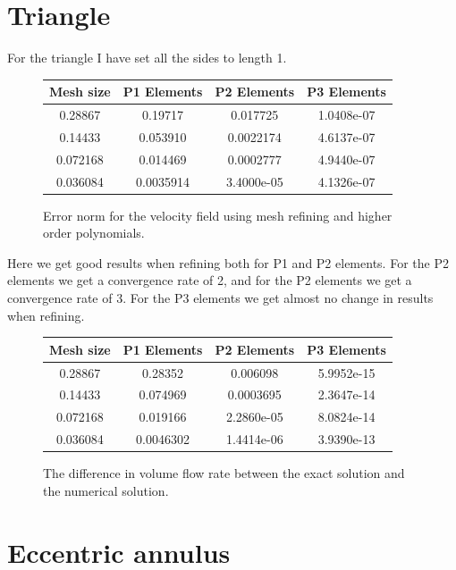 \documentclass[11pt]{report}
\begin{document}
\section*{Triangle}

For the triangle I have set all the sides to length 1.
\begin{figure}[htb]
\begin{center}
\begin{tabular}{|c|c|c|c|}
\hline
Mesh size & P1 Elements & P2 Elements & P3 Elements \\ \hline
0.28867 & 0.19717  & 0.017725 & 1.0408e-07         \\ \hline
0.14433 & 0.053910 & 0.0022174 & 4.6137e-07           \\ \hline
0.072168 & 0.014469 &  0.0002777 & 4.9440e-07           \\ \hline
0.036084 & 0.0035914 & 3.4000e-05 & 4.1326e-07           \\ \hline
\end{tabular}
\end {center}
\caption{Error norm for the velocity field using mesh refining and higher order polynomials.}
\end{figure}

Here we get good results when refining both for P1 and P2 elements. For the P2 elements we get a convergence rate of 2, and for the P2 elements we get a convergence rate of 3. For the P3 elements we get almost no change in results when refining.

\begin{figure}[htb]
\begin{center}
\begin{tabular}{|c|c|c|c|}
\hline
Mesh size & P1 Elements & P2 Elements & P3 Elements \\ \hline
0.28867 & 0.28352  & 0.006098 & 5.9952e-15         \\ \hline
0.14433 & 0.074969 & 0.0003695 & 2.3647e-14           \\ \hline
0.072168 & 0.019166 & 2.2860e-05 & 8.0824e-14           \\ \hline
0.036084 & 0.0046302 & 1.4414e-06 & 3.9390e-13           \\ \hline
\end{tabular}
\end {center}
\caption{The difference in volume flow rate between the exact solution and the numerical solution.}
\end{figure}

\section*{Eccentric annulus}
\end{document}
